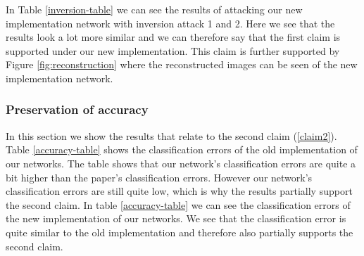 In Table \ref{inversion-table} we can see the results of attacking our new implementation network with inversion attack 1 and 2. Here we see that the results look a lot more similar and we can therefore say that the first claim is supported under our new implementation. This claim is further supported by Figure \ref{fig:reconstruction} where the reconstructed images can be seen of the new implementation network.

\subsubsection{Preservation of accuracy}
In this section we show the results that relate to the second claim (\ref{claim2}). 
Table \ref{accuracy-table} shows the classification errors of the old implementation of our networks. The table shows that our network's classification errors are quite a bit higher than the paper's classification errors. However our network's classification errors are still quite low, which is why the results partially support the second claim.
In table \ref{accuracy-table} we can see the classification errors of the new implementation of our networks. We see that the classification error is quite similar to the old implementation and therefore also partially supports the second claim.

